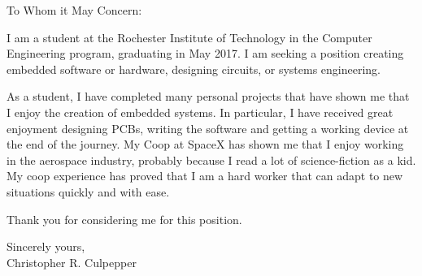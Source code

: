 \documentclass[line]{res}
\begin{document}
\setlength\columnsep{-30pt}
\address{56 South St.}
\address{Drury MA, 01343}
 
\begin{resume}
 \setlength\multicolsep{2pt}


 
\vspace{1in}
To Whom it May Concern:
 
I am a student at the Rochester Institute of Technology in the 
Computer Engineering program, graduating in May 2017. 
I am seeking a position creating embedded software or hardware, designing
circuits, or systems engineering. 
 
\noindent 
As a student, I have completed many personal projects that have shown me that I
enjoy the creation of embedded systems. In particular, I have received great
enjoyment designing PCBs, writing the software and getting a working device at
the end of the journey. My Coop at SpaceX has shown me that I enjoy working in
the aerospace industry, probably because I read a lot of science-fiction as a
kid. My coop experience has proved that I am a hard worker that can adapt to
new situations quickly and with ease.
 
\noindent Thank you for considering me for this position. 
 
Sincerely yours,
\\
Christopher R. Culpepper
\end{resume}
\end{document}
